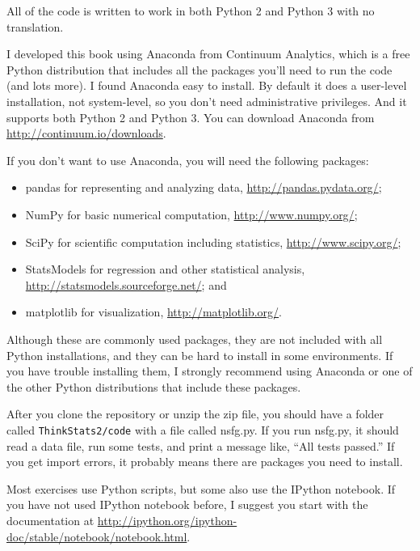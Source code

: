 \documentclass[12pt]{book}
\begin{document}
All of the code is written to work in both Python 2 and Python 3
with no translation.

I developed this book using Anaconda from
Continuum Analytics, which is a free Python distribution that includes
all the packages you'll need to run the code (and lots more).
I found Anaconda easy to install.  By default it does a user-level
installation, not system-level, so you don't need administrative
privileges.  And it supports both Python 2 and Python 3.  You can
download Anaconda from \url{http://continuum.io/downloads}.

If you don't want to use Anaconda, you will need the following
packages:

\begin{itemize}

\item pandas for representing and analyzing data,
  \url{http://pandas.pydata.org/};

\item NumPy for basic numerical computation, \url{http://www.numpy.org/};

\item SciPy for scientific computation including statistics,
  \url{http://www.scipy.org/};

\item StatsModels for regression and other statistical analysis,
\url{http://statsmodels.sourceforge.net/}; and

\item matplotlib for visualization, \url{http://matplotlib.org/}.

\end{itemize}

Although these are commonly used packages, they are not included with
all Python installations, and they can be hard to install in some
environments.  If you have trouble installing them, I strongly
recommend using Anaconda or one of the other Python distributions
that include these packages.

After you clone the repository or unzip the zip file, you should have
a folder called {\tt ThinkStats2/code} with a file called {nsfg.py}.
If you run {nsfg.py}, it should read a data file, run some tests, and print a
message like, ``All tests passed.''  If you get import errors, it
probably means there are packages you need to install.

Most exercises use Python scripts, but some also use the IPython
notebook.  If you have not used IPython notebook before, I suggest
you start with the documentation at
\url{http://ipython.org/ipython-doc/stable/notebook/notebook.html}.
\end{document}
